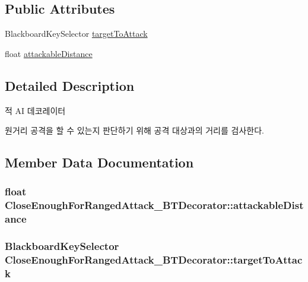 \subsection*{Public Attributes}
\begin{DoxyCompactItemize}
\item 
Blackboard\+Key\+Selector \hyperlink{class_close_enough_for_ranged_attack___b_t_decorator_a830126ebaba4083a84ea549114ef39d7}{target\+To\+Attack}
\item 
float \hyperlink{class_close_enough_for_ranged_attack___b_t_decorator_a28155d62ff5f45740dad3dfec7254e5e}{attackable\+Distance}
\end{DoxyCompactItemize}


\subsection{Detailed Description}
적 AI 데코레이터 

원거리 공격을 할 수 있는지 판단하기 위해 공격 대상과의 거리를 검사한다. 

\subsection{Member Data Documentation}
\subsubsection[{\texorpdfstring{attackable\+Distance}{attackableDistance}}]{\setlength{\rightskip}{0pt plus 5cm}float Close\+Enough\+For\+Ranged\+Attack\+\_\+\+B\+T\+Decorator\+::attackable\+Distance}\hypertarget{class_close_enough_for_ranged_attack___b_t_decorator_a28155d62ff5f45740dad3dfec7254e5e}{}\label{class_close_enough_for_ranged_attack___b_t_decorator_a28155d62ff5f45740dad3dfec7254e5e}
\subsubsection[{\texorpdfstring{target\+To\+Attack}{targetToAttack}}]{\setlength{\rightskip}{0pt plus 5cm}Blackboard\+Key\+Selector Close\+Enough\+For\+Ranged\+Attack\+\_\+\+B\+T\+Decorator\+::target\+To\+Attack}\hypertarget{class_close_enough_for_ranged_attack___b_t_decorator_a830126ebaba4083a84ea549114ef39d7}{}\label{class_close_enough_for_ranged_attack___b_t_decorator_a830126ebaba4083a84ea549114ef39d7}
